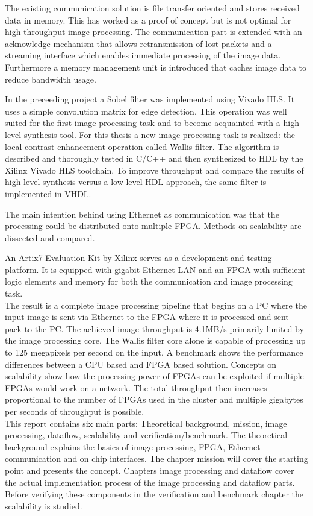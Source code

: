 The existing communication solution is file transfer oriented and stores
received data in memory. This has worked as a proof of concept but is not
optimal
for high throughput image processing. The communication part is extended with an
acknowledge mechanism that allows retransmission of lost packets and a streaming
interface which enables immediate processing of the image data. Furthermore a
memory management unit is introduced that caches image data to reduce bandwidth
usage.

In the preceeding project a Sobel filter was implemented using Vivado HLS. It
uses a simple convolution matrix for edge detection. This operation was well
suited for the first image processing task and to become acquainted with a high
level synthesis tool. For this thesis a new image processing task is realized: the
local contrast enhancement operation called Wallis filter. The algorithm is
described and thoroughly
tested in C/C++ and then synthesized to HDL by the Xilinx Vivado HLS toolchain.
To improve throughput and compare the results of high level synthesis versus a
low level HDL approach, the same filter is implemented in VHDL.

The main intention behind using Ethernet as communication was that the
processing could be distributed onto multiple FPGA. Methods on scalability are
dissected and compared.

An Artix7 Evaluation Kit by Xilinx serves as a development and testing platform.
It is equipped with gigabit Ethernet LAN and an FPGA with sufficient logic
elements and memory for both the communication and image processing task.
\\

The result is a complete image processing pipeline that begins on a PC where the
input image is sent via Ethernet to the FPGA where it is processed and sent pack
to the PC. The achieved image throughput is 4.1MB/s primarily limited by the image processing core. The Wallis filter core alone
is capable of processing up to 125 megapixels per second on the input. A
benchmark shows the performance differences between a CPU based and FPGA based
solution. 
Concepts on scalability show how the processing power of FPGAs can be
exploited if multiple FPGAs would work on a network. The total throughput then
increases proportional to the number of FPGAs used in the cluster and multiple
gigabytes per seconds of throughput is possible.
\\

This report contains six main parts: Theoretical background, mission,
image processing, dataflow, scalability and verification/benchmark.  The
theoretical background explains
the basics of image processing, FPGA, Ethernet communication and on chip
interfaces. The chapter mission will
cover the starting point and presents the concept. Chapters 
image processing and dataflow cover the actual
implementation process of the image processing and dataflow parts.
Before verifying these components in the verification and benchmark chapter the
scalability is studied.

